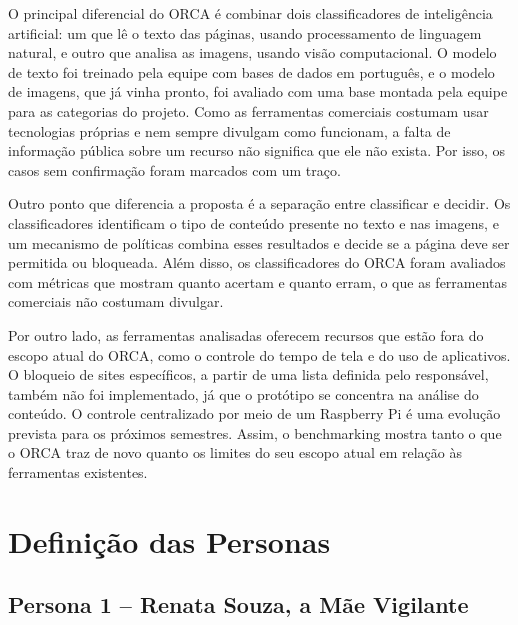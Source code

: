 \documentclass[
    12pt,           %
    oneside,        %
    a4paper,        %
    chapter=TITLE,  %
    english,        %
    brazil          %
]{abntex2}
\begin{document}
O principal diferencial do ORCA é combinar dois classificadores de
inteligência artificial: um que lê o texto das páginas, usando processamento
de linguagem natural, e outro que analisa as imagens, usando visão
computacional. O modelo de texto foi treinado pela equipe com bases de dados
em português, e o modelo de imagens, que já vinha pronto, foi avaliado com uma
base montada pela equipe para as categorias do projeto. Como as ferramentas
comerciais costumam usar tecnologias próprias e nem sempre divulgam como
funcionam, a falta de informação pública sobre um recurso não significa que
ele não exista. Por isso, os casos sem confirmação foram marcados com um
traço.

Outro ponto que diferencia a proposta é a separação entre classificar e
decidir. Os classificadores identificam o tipo de conteúdo presente no texto e
nas imagens, e um mecanismo de políticas combina esses resultados e decide se
a página deve ser permitida ou bloqueada. Além disso, os classificadores do
ORCA foram avaliados com métricas que mostram quanto acertam e quanto erram,
o que as ferramentas comerciais não costumam divulgar.

Por outro lado, as ferramentas analisadas oferecem recursos que estão fora do
escopo atual do ORCA, como o controle do tempo de tela e do uso de
aplicativos. O bloqueio de sites específicos, a partir de uma lista definida
pelo responsável, também não foi implementado, já que o protótipo se
concentra na análise do conteúdo. O controle centralizado por meio de um
Raspberry Pi é uma evolução prevista para os próximos semestres. Assim, o
benchmarking mostra tanto o que o ORCA traz de novo quanto os limites do seu
escopo atual em relação às ferramentas existentes.
\chapter{Definição das Personas}
\label{cap:personas}

\section{Persona 1 -- Renata Souza, a Mãe Vigilante}
\end{document}
